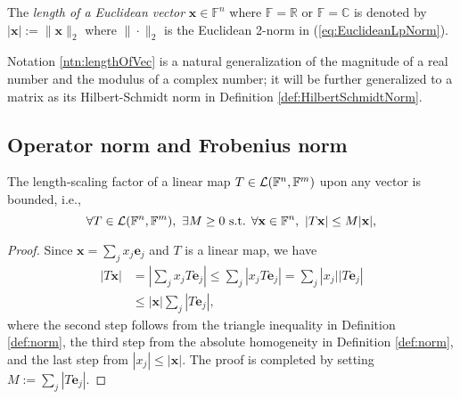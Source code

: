 \begin{ntn}
  \label{ntn:lengthOfVec}
  The \emph{length of a Euclidean vector}
  $\mathbf{x}\in \mathbb{F}^n$
  where $\mathbb{F}=\mathbb{R}$ or $\mathbb{F}=\mathbb{C}$
  is denoted by $|\mathbf{x}|:=\|\mathbf{x}\|_2$
  where $\|\cdot\|_2$ is
  the Euclidean 2-norm in (\ref{eq:EuclideanLpNorm}).
\end{ntn}

\begin{rem}
  Notation \ref{ntn:lengthOfVec} is a natural generalization
  of the magnitude of a real number and the modulus of a complex number;
  it will be further generalized to a matrix as its Hilbert-Schmidt norm
  in Definition \ref{def:HilbertSchmidtNorm}.
\end{rem}


\subsection{Operator norm and Frobenius norm}
\label{sec:operator-norm}

\begin{lem}
  \label{lem:linearOperatorBounded}
  The length-scaling factor of a linear map
  \mbox{$T\in {\cal L}(\mathbb{F}^n,\mathbb{F}^m)$}
  upon any vector is bounded, i.e., 
  \begin{equation}
    \label{eq:linearOperatorBounded}
    \forall T\in {\cal L}(\mathbb{F}^n,\mathbb{F}^m),\ 
    \exists M\ge 0 \text{ s.t. }
    \forall \mathbf{x}\in \mathbb{F}^n,\
    |T\mathbf{x}|\le M|\mathbf{x}|,
  \end{equation}
\end{lem}
\begin{proof}
  Since $\mathbf{x}=\sum_j x_j\mathbf{e}_j$
  and $T$ is a linear map, we have
  \begin{displaymath}
    \begin{array}{rl}
    |T\mathbf{x}| &= \left|\sum_j x_j T \mathbf{e}_j\right|
                    \le \sum_j \left| x_j T \mathbf{e}_j\right|
                    = \sum_j \left| x_j||T \mathbf{e}_j\right|
    \\
    &\le  |\mathbf{x}| \sum_j\left|T \mathbf{e}_j\right|, 
    \end{array}
  \end{displaymath}
  where the second step follows from the triangle inequality
  in Definition \ref{def:norm}, 
  the third step from the absolute homogeneity 
  in Definition \ref{def:norm}, 
  and the last step from $|x_j|\le |\mathbf{x}|$.
  The proof is completed by setting
  $M:=\sum_j\left|T \mathbf{e}_j\right|$.
\end{proof}

